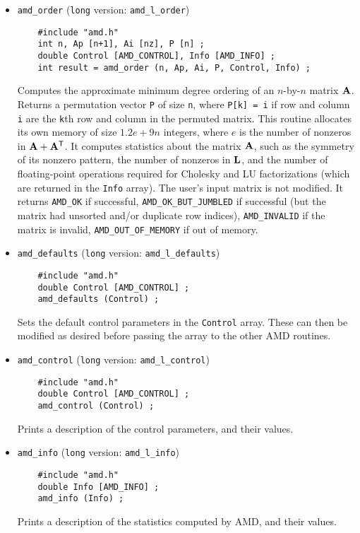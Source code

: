 \documentclass[11pt]{article}
\newcommand{\m}[1]{{\bf{#1}}}       %
\newcommand{\tr}{^{\sf T}}          %
\begin{document}
\begin{itemize}
\item {\tt amd\_order}
({\tt long} version: {\tt amd\_l\_order})
    {\footnotesize
    \begin{verbatim}
    #include "amd.h"
    int n, Ap [n+1], Ai [nz], P [n] ;
    double Control [AMD_CONTROL], Info [AMD_INFO] ;
    int result = amd_order (n, Ap, Ai, P, Control, Info) ;
    \end{verbatim}
    }
    Computes the approximate minimum degree ordering of an $n$-by-$n$ matrix
    $\m{A}$.  Returns a permutation vector {\tt P} of size {\tt n}, where
    {\tt P[k] = i} if row and column {\tt i} are the {\tt k}th row and
    column in the permuted matrix.
    This routine allocates its own memory of size $1.2e+9n$ integers,
    where $e$ is the number of nonzeros in $\m{A}+\m{A}\tr$.
    It computes statistics about the matrix $\m{A}$, such as the symmetry of
    its nonzero pattern, the number of nonzeros in $\m{L}$,
    and the number of floating-point operations required for Cholesky and LU
    factorizations (which are returned in the {\tt Info} array).
    The user's input matrix is not modified.
    It returns {\tt AMD\_OK} if successful,
    {\tt AMD\_OK\_BUT\_JUMBLED} if successful (but the matrix had unsorted
    and/or duplicate row indices),
    {\tt AMD\_INVALID} if the matrix is invalid,
    {\tt AMD\_OUT\_OF\_MEMORY} if out of memory.

\item {\tt amd\_defaults}
({\tt long} version: {\tt amd\_l\_defaults})
    {\footnotesize
    \begin{verbatim}
    #include "amd.h"
    double Control [AMD_CONTROL] ;
    amd_defaults (Control) ;
    \end{verbatim}
    }
    Sets the default control parameters in the {\tt Control} array.  These can
    then be modified as desired before passing the array to the other AMD
    routines.

\item {\tt amd\_control}
({\tt long} version: {\tt amd\_l\_control})
    {\footnotesize
    \begin{verbatim}
    #include "amd.h"
    double Control [AMD_CONTROL] ;
    amd_control (Control) ;
    \end{verbatim}
    }
    Prints a description of the control parameters, and their values.

\item {\tt amd\_info}
({\tt long} version: {\tt amd\_l\_info})
    {\footnotesize
    \begin{verbatim}
    #include "amd.h"
    double Info [AMD_INFO] ;
    amd_info (Info) ;
    \end{verbatim}
    }
    Prints a description of the statistics computed by AMD, and their values.


\end{itemize}
\end{document}
